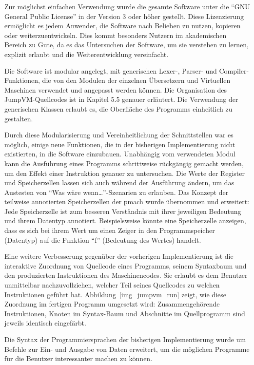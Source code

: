 \documentclass[german, a4paper, parskip, bibliography=totoc]{scrartcl}
\begin{document}
Zur möglichst einfachen Verwendung wurde die gesamte Software unter die
\enquote{GNU General Public License} in der Version 3 oder höher gestellt.
Diese Lizenzierung ermöglicht es jedem Anwender, die Software nach Belieben zu
nutzen, kopieren oder weiterzuentwickeln. Dies kommt besonders Nutzern im
akademischen Bereich zu Gute, da es das Untersuchen der Software, um sie
verstehen zu lernen, explizit erlaubt und die Weiterentwicklung vereinfacht.

Die Software ist modular angelegt, mit generischen Lexer-, Parser- und
Compiler-Funk\-ti\-on\-en, die von den Modulen der einzelnen Übersetzern und
Virtuellen Maschinen verwendet und angepasst werden können. Die Organisation
des JumpVM-Quellcodes ist in Kapitel 5.5 genauer erläutert. Die Verwendung der
generischen Klassen erlaubt es, die Oberfläche des Programms einheitlich zu
gestalten.

Durch diese Modularisierung und Vereinheitlichung der Schnittstellen war es
möglich, einige neue Funktionen, die in der bisherigen Implementierung nicht
existierten, in die Software einzubauen. Unabhängig vom verwendeten Modul kann
die Ausführung eines Programms schrittweise rückgängig gemacht werden, um den
Effekt einer Instruktion genauer zu untersuchen. Die Werte der Register und
Speicherzellen lassen sich auch während der Ausführung ändern, um das Austesten
von \enquote{Was wäre wenn\ldots{}}-Szenarien zu erlauben. Das Konzept der
teilweise annotierten Speicherzellen der pmach wurde übernommen und erweitert:
Jede Speicherzelle ist zum besseren Verständnis mit ihrer jeweiligen Bedeutung
und ihrem Datentyp annotiert. Beispielsweise könnte eine Speicherzelle
anzeigen, dass es sich bei ihrem Wert um einen Zeiger in den Programmspeicher
(Datentyp) auf die Funktion \enquote{f} (Bedeutung des Wertes) handelt.

Eine weitere Verbesserung gegenüber der vorherigen Implementierung ist die
interaktive Zuordnung von Quellcode eines Programms, seinem Syntaxbaum und den
produzierten Instruktionen des Maschinencodes. Sie erlaubt es dem Benutzer
unmittelbar nachzuvollziehen, welcher Teil seines Quellcodes zu welchen
Instruktionen geführt hat. Abbildung~\ref{img_jumpvm_run} zeigt, wie diese
Zuordnung im fertigen Programm umgesetzt wird: Zusammengehörende Instruktionen,
Knoten im Syntax-Baum und Abschnitte im Quellprogramm sind jeweils identisch
eingefärbt.

Die Syntax der Programmiersprachen der bisherigen Implementierung wurde um
Befehle zur Ein- und Ausgabe von Daten erweitert, um die möglichen Programme
für die Benutzer interessanter machen zu können.
\end{document}
